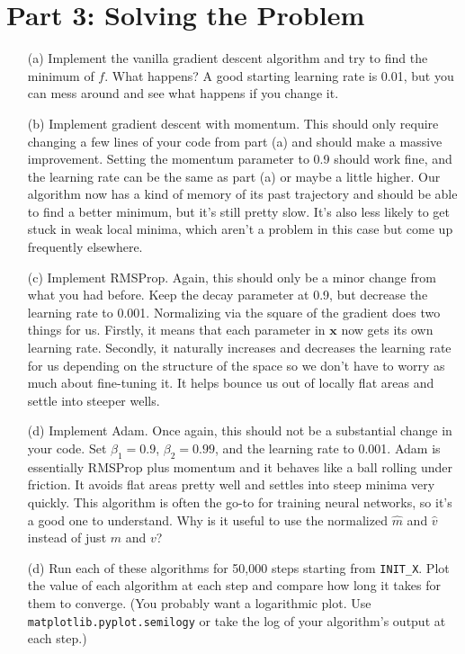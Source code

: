 \documentclass[12pt]{article}
\begin{document}
\section*{Part 3: Solving the Problem}

\begin{enumerate}
\item[(a)]
	Implement the vanilla gradient descent algorithm and try to find the minimum of $f$.  What happens?  A good starting learning rate is 0.01, but you can mess around and see what happens if you change it.
	
	
\item[(b)]
	Implement gradient descent with momentum.  This should only require changing a few lines of your code from part (a) and should make a massive improvement.  Setting the momentum parameter to 0.9 should work fine, and the learning rate can be the same as part (a) or maybe a little higher.  Our algorithm now has a kind of memory of its past trajectory and should be able to find a better minimum, but it's still pretty slow.  It's also less likely to get stuck in weak local minima, which aren't a problem in this case but come up frequently elsewhere.
	

\item[(c)]
	Implement RMSProp.  Again, this should only be a minor change from what you had before.  Keep the decay parameter at 0.9, but decrease the learning rate to 0.001.  Normalizing via the square of the gradient does two things for us.  Firstly, it means that each parameter in $\mathbf{x}$ now gets its own learning rate.  Secondly, it naturally increases and decreases the learning rate for us depending on the structure of the space so we don't have to worry as much about fine-tuning it.  It helps bounce us out of locally flat areas and settle into steeper wells.
	
	
\item[(d)]
	Implement Adam.  Once again, this should not be a substantial change in your code.  Set $\beta_1 = 0.9$, $\beta_2 = 0.99$, and the learning rate to 0.001.  Adam is essentially RMSProp plus momentum and it behaves like a ball rolling under friction.  It avoids flat areas pretty well and settles into steep minima very quickly.  This algorithm is often the go-to for training neural networks, so it's a good one to understand.  Why is it useful to use the normalized $\hat{m}$ and $\hat{v}$ instead of just $m$ and $v$?
		
		
\item[(d)]
	Run each of these algorithms for 50,000 steps starting from \texttt{INIT\_X}.  Plot the value of each algorithm at each step and compare how long it takes for them to converge.  (You probably want a logarithmic plot.  Use \texttt{matplotlib.pyplot.semilogy} or take the log of your algorithm's output at each step.)
	

\end{enumerate}
\end{document}
